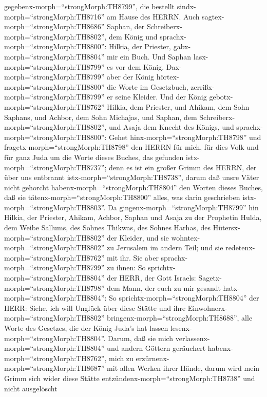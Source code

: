 gegebenx-morph=``strongMorph:TH8799'', die bestellt
sindx-morph=``strongMorph:TH8716'' am Hause des HERRN. 
Auch sagtex-morph=``strongMorph:TH8686'' Saphan, der
Schreiberx-morph=``strongMorph:TH8802'', dem König und
sprachx-morph=``strongMorph:TH8800'': Hilkia, der Priester,
gabx-morph=``strongMorph:TH8804'' mir ein Buch. Und Saphan
lasx-morph=``strongMorph:TH8799'' es vor dem König. 
Dax-morph=``strongMorph:TH8799'' aber der König
hörtex-morph=``strongMorph:TH8800'' die Worte im Gesetzbuch,
zerrißx-morph=``strongMorph:TH8799'' er seine Kleider.  Und
der König gebotx-morph=``strongMorph:TH8762'' Hilkia, dem Priester, und
Ahikam, dem Sohn Saphans, und Achbor, dem Sohn Michajas, und Saphan, dem
Schreiberx-morph=``strongMorph:TH8802'', und Asaja dem Knecht des
Königs, und sprachx-morph=``strongMorph:TH8800'':  Gehet
hinx-morph=``strongMorph:TH8798'' und
fragetx-morph=``strongMorph:TH8798'' den HERRN für mich, für dies Volk
und für ganz Juda um die Worte dieses Buches, das gefunden
istx-morph=``strongMorph:TH8737''; denn es ist ein großer Grimm des
HERRN, der über uns entbrannt istx-morph=``strongMorph:TH8738'', darum
daß unsre Väter nicht gehorcht habenx-morph=``strongMorph:TH8804'' den
Worten dieses Buches, daß sie tätenx-morph=``strongMorph:TH8800'' alles,
was darin geschrieben istx-morph=``strongMorph:TH8803''. 
Da gingenx-morph=``strongMorph:TH8799'' hin Hilkia, der Priester,
Ahikam, Achbor, Saphan und Asaja zu der Prophetin Hulda, dem Weibe
Sallums, des Sohnes Thikwas, des Sohnes Harhas, des
Hütersx-morph=``strongMorph:TH8802'' der Kleider, und sie
wohntex-morph=``strongMorph:TH8802'' zu Jerusalem im andern Teil; und
sie redetenx-morph=``strongMorph:TH8762'' mit ihr.  Sie
aber sprachx-morph=``strongMorph:TH8799'' zu ihnen: So
sprichtx-morph=``strongMorph:TH8804'' der HERR, der Gott Israels:
Sagetx-morph=``strongMorph:TH8798'' dem Mann, der euch zu mir gesandt
hatx-morph=``strongMorph:TH8804'':  So
sprichtx-morph=``strongMorph:TH8804'' der HERR: Siehe, ich will Unglück
über diese Stätte und ihre Einwohnerx-morph=``strongMorph:TH8802''
bringenx-morph=``strongMorph:TH8688'', alle Worte des Gesetzes, die der
König Juda's hat lassen lesenx-morph=``strongMorph:TH8804''.
 Darum, daß sie mich
verlassenx-morph=``strongMorph:TH8804'' und andern Göttern geräuchert
habenx-morph=``strongMorph:TH8762'', mich zu
erzürnenx-morph=``strongMorph:TH8687'' mit allen Werken ihrer Hände,
darum wird mein Grimm sich wider diese Stätte
entzündenx-morph=``strongMorph:TH8738'' und nicht ausgelöscht
